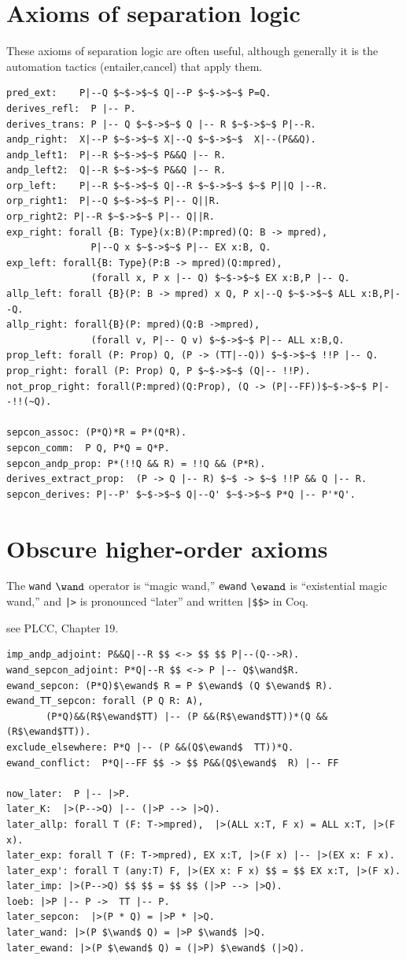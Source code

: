 \documentclass[12pt,fleqn,openany,oneside,showtrims]{memoir}
\newcommand{\ychapter}[2]{\chapter[#1]{#1}}
\begin{document}
\ychapter{Axioms of separation logic}{(see PLCC \autoref{ch:logic})}
These axioms of separation logic are often useful,
although generally it is the automation tactics
(\textsf{entailer,cancel}) that apply them.

\begin{lstlisting}
pred_ext:    P|--Q $~$->$~$ Q|--P $~$->$~$ P=Q.
derives_refl:  P |-- P.
derives_trans: P |-- Q $~$->$~$ Q |-- R $~$->$~$ P|--R.
andp_right:  X|--P $~$->$~$ X|--Q $~$->$~$  X|--(P&&Q).
andp_left1:  P|--R $~$->$~$ P&&Q |-- R.
andp_left2:  Q|--R $~$->$~$ P&&Q |-- R.
orp_left:    P|--R $~$->$~$ Q|--R $~$->$~$ $~$ P||Q |--R.
orp_right1:  P|--Q $~$->$~$ P|-- Q||R.
orp_right2: P|--R $~$->$~$ P|-- Q||R.
exp_right: forall {B: Type}(x:B)(P:mpred)(Q: B -> mpred),
               P|--Q x $~$->$~$ P|-- EX x:B, Q.
exp_left: forall{B: Type}(P:B -> mpred)(Q:mpred),
               (forall x, P x |-- Q) $~$->$~$ EX x:B,P |-- Q.
allp_left: forall {B}(P: B -> mpred) x Q, P x|--Q $~$->$~$ ALL x:B,P|--Q.
allp_right: forall{B}(P: mpred)(Q:B ->mpred),
               (forall v, P|-- Q v) $~$->$~$ P|-- ALL x:B,Q.
prop_left: forall (P: Prop) Q, (P -> (TT|--Q)) $~$->$~$ !!P |-- Q.
prop_right: forall (P: Prop) Q, P $~$->$~$ (Q|-- !!P).
not_prop_right: forall(P:mpred)(Q:Prop), (Q -> (P|--FF))$~$->$~$ P|--!!(~Q).

sepcon_assoc: (P*Q)*R = P*(Q*R).
sepcon_comm:  P Q, P*Q = Q*P.
sepcon_andp_prop: P*(!!Q && R) = !!Q && (P*R).
derives_extract_prop:  (P -> Q |-- R) $~$ -> $~$ !!P && Q |-- R.
sepcon_derives: P|--P' $~$->$~$ Q|--Q' $~$->$~$ P*Q |-- P'*Q'.
\end{lstlisting}

\chapter{Obscure higher-order axioms}

The \lstinline{wand} $\wand$ operator is ``magic wand,''
\lstinline{ewand} $\ewand$ is ``existential magic wand,''
and \lstinline{|>} is pronounced ``later''
and written \lstinline{|$$>} in Coq.

see PLCC, Chapter 19.

\begin{lstlisting}
imp_andp_adjoint: P&&Q|--R $$ <-> $$ $$ P|--(Q-->R).
wand_sepcon_adjoint: P*Q|--R $$ <-> P |-- Q$\wand$R.
ewand_sepcon: (P*Q)$\ewand$ R = P $\ewand$ (Q $\ewand$ R).
ewand_TT_sepcon: forall (P Q R: A),
       (P*Q)&&(R$\ewand$TT) |-- (P &&(R$\ewand$TT))*(Q && (R$\ewand$TT)).
exclude_elsewhere: P*Q |-- (P &&(Q$\ewand$  TT))*Q.
ewand_conflict:  P*Q|--FF $$ -> $$ P&&(Q$\ewand$  R) |-- FF

now_later:  P |-- |>P.
later_K:  |>(P-->Q) |-- (|>P --> |>Q).
later_allp: forall T (F: T->mpred),  |>(ALL x:T, F x) = ALL x:T, |>(F x).
later_exp: forall T (F: T->mpred), EX x:T, |>(F x) |-- |>(EX x: F x).
later_exp': forall T (any:T) F, |>(EX x: F x) $$ = $$ EX x:T, |>(F x).
later_imp: |>(P-->Q) $$ $$ = $$ $$ (|>P --> |>Q).
loeb: |>P |-- P ->  TT |-- P.
later_sepcon:  |>(P * Q) = |>P * |>Q.
later_wand: |>(P $\wand$ Q) = |>P $\wand$ |>Q.
later_ewand: |>(P $\ewand$ Q) = (|>P) $\ewand$ (|>Q).
\end{lstlisting}
\end{document}
